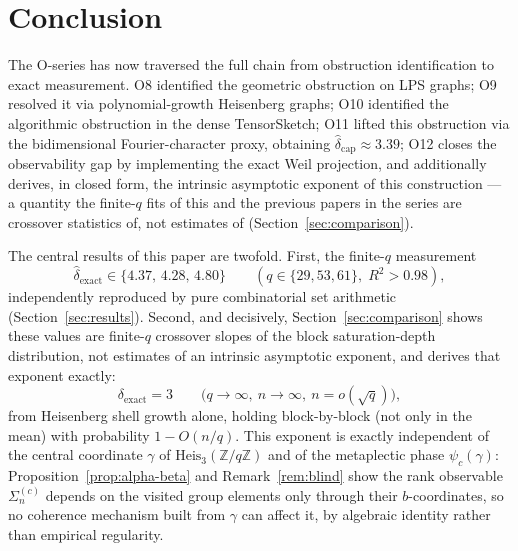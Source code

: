 \section{Conclusion}
  \label{sec:conclusion}

  The O-series has now traversed the full chain from obstruction identification
  to exact measurement.
  O8 identified the geometric obstruction on LPS graphs;
  O9 resolved it via polynomial-growth Heisenberg graphs;
  O10 identified the algorithmic obstruction in the dense TensorSketch;
  O11 lifted this obstruction via the bidimensional Fourier-character proxy,
  obtaining $\hat{\delta}_{\mathrm{cap}} \approx 3.39$;
  O12 closes the observability gap by implementing the exact Weil projection, and
  additionally derives, in closed form, the intrinsic asymptotic exponent of this
  construction — a quantity the finite-$q$ fits of this and the previous papers in the
  series are crossover statistics of, not estimates of (Section~\ref{sec:comparison}).

  The central results of this paper are twofold.
  First, the finite-$q$ measurement
  \begin{equation}
    \hat{\delta}_{\mathrm{exact}} \in \{4.37,\,4.28,\,4.80\}
    \qquad (q \in \{29,53,61\},\; R^2 > 0.98),
    \label{eq:conclusion-finite-q}
  \end{equation}
  independently reproduced by pure combinatorial set arithmetic (Section~\ref{sec:results}).
  Second, and decisively, Section~\ref{sec:comparison} shows these values are finite-$q$
  crossover slopes of the block saturation-depth distribution, not estimates of an intrinsic
  asymptotic exponent, and derives that exponent exactly:
  \begin{equation}
    \delta_{\mathrm{exact}} = 3
    \qquad \bigl(q\to\infty,\ n\to\infty,\ n=o(\sqrt{q})\bigr),
    \label{eq:conclusion-asymptotic}
  \end{equation}
  from Heisenberg shell growth alone, holding block-by-block (not only in the mean) with
  probability $1-O(n/q)$.
  This exponent is exactly independent of the central coordinate $\gamma$ of
  $\mathrm{Heis}_3(\mathbb{Z}/q\mathbb{Z})$ and of the metaplectic phase $\psi_c(\gamma)$:
  Proposition~\ref{prop:alpha-beta} and Remark~\ref{rem:blind} show the rank observable
  $\Sigma_n^{(c)}$ depends on the visited group elements only through their $b$-coordinates,
  so no coherence mechanism built from $\gamma$ can affect it, by algebraic identity rather
  than empirical regularity.

